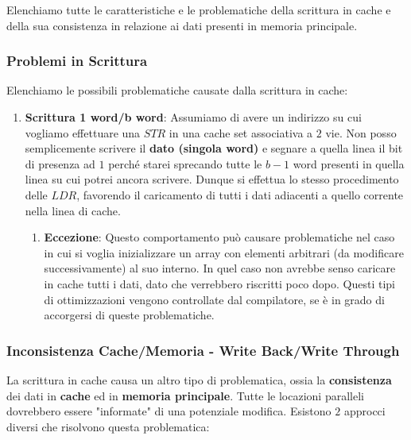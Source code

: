 \documentclass{article}
\begin{document}
Elenchiamo tutte le caratteristiche e le problematiche della scrittura in cache e della sua consistenza in relazione ai dati presenti in memoria principale.

\subsubsection{Problemi in Scrittura}

Elenchiamo le possibili problematiche causate dalla scrittura in cache:

\begin{enumerate}
    \item \textbf{Scrittura 1 word/b word}: Assumiamo di avere un indirizzo su cui vogliamo effettuare una $STR$ in una cache set associativa a $2$ vie. Non posso semplicemente scrivere il \textbf{dato (singola word)} e segnare a quella linea il bit di presenza ad $1$ perché starei sprecando tutte le $b-1$ word presenti in quella linea su cui potrei ancora scrivere. Dunque si effettua lo stesso procedimento delle $LDR$, favorendo il caricamento di tutti i dati adiacenti a quello corrente nella linea di cache.
    
    \begin{enumerate}
        \item \textbf{Eccezione}: Questo comportamento può causare problematiche nel caso in cui si voglia inizializzare un array con elementi arbitrari (da modificare successivamente) al suo interno. In quel caso non avrebbe senso caricare in cache tutti i dati, dato che verrebbero riscritti poco dopo. Questi tipi di ottimizzazioni vengono controllate dal compilatore, se è in grado di accorgersi di queste problematiche.
    \end{enumerate}
\end{enumerate}

\subsubsection{Inconsistenza Cache/Memoria - Write Back/Write Through}

La scrittura in cache causa un altro tipo di problematica, ossia la \textbf{consistenza} dei dati in \textbf{cache} ed in \textbf{memoria principale}. Tutte le locazioni paralleli dovrebbero essere "informate" di una potenziale modifica. Esistono $2$ approcci diversi che risolvono questa problematica:
\end{document}
